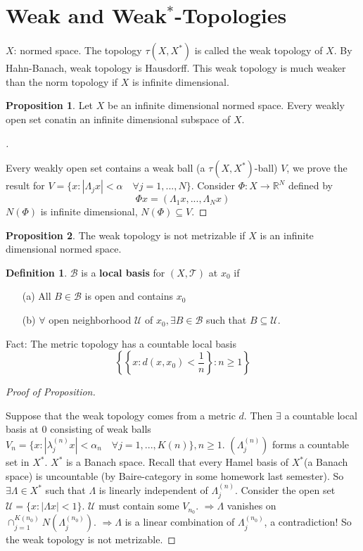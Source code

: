 \documentclass{article}
\theoremstyle{definition}
\newtheorem{dfn}{Definition}
\newtheorem{prop}{Proposition}
\newenvironment{proofs}[1][\proofname]{%
  \begin{proof}[#1]$ $\par\nobreak\ignorespaces
}{%
  \end{proof}
}
\newcommand{\B}{\mathcal B}
\newcommand{\RR}{\mathbb R}
\newcommand{\T}{\mathcal T}
\newcommand{\U}{\mathcal U}
\newcommand{\Ra}{\Rightarrow}
\begin{document}
\section{Weak and Weak$^{*}$-Topologies}

$X$: normed space.
The topology $\tau(X, X^*)$ is called the weak topology of $X$.
By Hahn-Banach, weak topology is Hausdorff.
This weak topology is much weaker than the norm topology if $X$ is infinite dimensional.

\begin{prop}
	Let $X$ be an infinite dimensional normed space.
	Every weakly open set conatin an infinite dimensional subspace of $X$.
\end{prop}

\begin{proofs}
	Every weakly open set contains a weak ball (a $\tau(X, X^*)$-ball) $V$, we prove the result for $V = \{x: |\Lambda_j x| < \alpha \quad \forall j = 1, ..., N\}$.
	Consider $\Phi: X \to \RR^N$ defined by 
	\[
		\Phi x = (\Lambda_1 x, ..., \Lambda_N x)
	\]
	$N(\Phi)$ is infinite dimensional, $N(\Phi) \subseteq V$.
\end{proofs}

\begin{prop}
	The weak topology is not metrizable if $X$ is an infinite dimensional normed space.
\end{prop}

\begin{dfn}
	$\B$ is a \textbf{local basis} for $(X, \T)$ at $x_0$ if 
	\begin{enumerate}
		\item[(a)] All $B \in \B$ is open and contains $x_0$

		\item[(b)] $\forall$ open neighborhood $\U$ of $x_0, \exists B \in \B$ such that $B \subseteq \U$.
	\end{enumerate}
\end{dfn}

Fact: The metric topology has a countable local basis
\[
	\left\{ \left\{ x: d(x, x_0) < \frac{1}{n} \right\}: n \geq 1 \right\}
\]

\begin{proofs}[Proof of Proposition]
	Suppose that the weak topology comes from a metric $d$.
	Then $\exists$ a countable local basis at $0$ consisting of weak balls $V_n = \{x: |\lambda_j^{(n)}x| < \alpha_n \quad \forall j = 1, ..., K(n)\}, n \geq 1$.
	$(\Lambda_j^{(n)})$ forms a countable set in $X^*$.
	$X^*$ is a Banach space.
	Recall that every Hamel basis of $X^*$(a Banach space) is uncountable (by Baire-category in some homework last semester).
	So $\exists \Lambda \in X^*$ such that $\Lambda$ is linearly independent of $\Lambda_j^{(n)}$.
	Consider the open set $\U = \{x: |\Lambda x| < 1\}$.
	$\U$ must contain some $V_{n_0}$.
	$\Ra \Lambda$ vanishes on $\cap_{j = 1}^{K(n_0)} N(\Lambda_j^{(n_0)})$.
	$\Ra \Lambda$ is a linear combination of $\Lambda_j^{(n_0)}$, a contradiction!
	So the weak topology is not metrizable.
\end{proofs}
\end{document}
